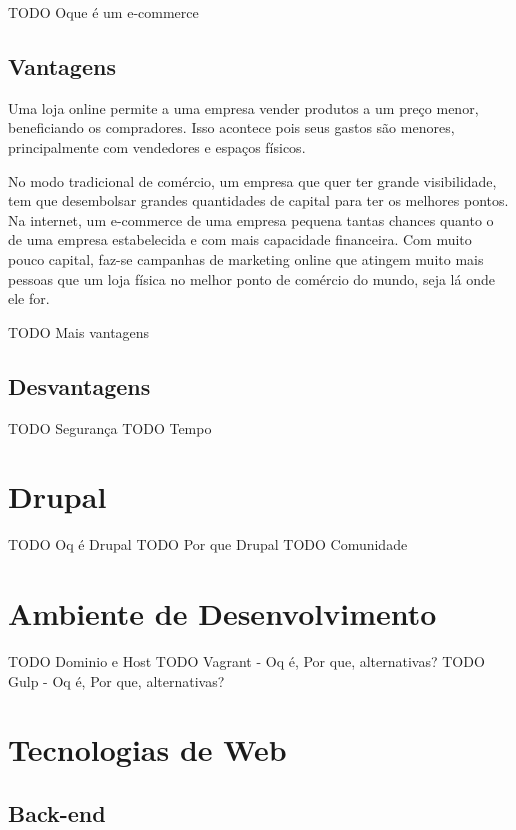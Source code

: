 TODO Oque é um e-commerce

\subsection{Vantagens}

Uma loja online permite a uma empresa vender produtos a um preço menor, beneficiando os compradores. Isso acontece pois seus gastos são menores, principalmente com vendedores e espaços físicos.

No modo tradicional de comércio, um empresa que quer ter grande visibilidade, tem que desembolsar grandes quantidades de capital para ter os melhores pontos. Na internet, um e-commerce de uma empresa pequena tantas chances quanto o de uma empresa estabelecida e com mais capacidade financeira. Com muito pouco capital, faz-se campanhas de marketing online que atingem muito mais pessoas que um loja física no melhor ponto de comércio do mundo, seja lá onde ele for.

TODO Mais vantagens

\subsection{Desvantagens}

TODO Segurança
TODO Tempo

\section{Drupal}

TODO Oq é Drupal
TODO Por que Drupal
TODO Comunidade

\section{Ambiente de Desenvolvimento}

TODO Dominio e Host
TODO Vagrant - Oq é, Por que, alternativas?
TODO Gulp - Oq é, Por que, alternativas?

\section{Tecnologias de Web}

\subsection{Back-end}

